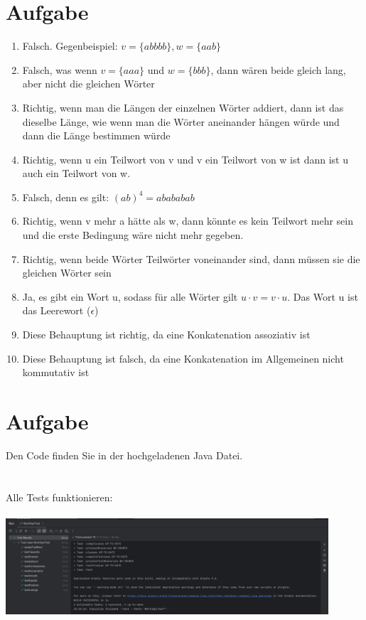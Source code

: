 \documentclass[a4paper,12pt,titlepage]{article}
\begin{document}
\section{Aufgabe}
\begin{enumerate}
\item Falsch. Gegenbeispiel: $v = \{abbbb\}, w = \{aab\}$
\item Falsch, was wenn $v = \{aaa\}$ und $w = \{bbb\}$, dann wären beide gleich lang, aber nicht die gleichen Wörter
\item Richtig, wenn man die Längen der einzelnen Wörter addiert, dann ist das dieselbe Länge, wie wenn man die Wörter aneinander hängen würde und dann die Länge bestimmen würde
\item Richtig, wenn u ein Teilwort von v und v ein Teilwort von w ist dann ist u auch ein Teilwort von w.
\item Falsch, denn es gilt: $(ab)^4 = abababab$
\item Richtig, wenn v mehr a hätte als w, dann könnte es kein Teilwort mehr sein und die erste Bedingung wäre nicht mehr gegeben.
\item Richtig, wenn beide Wörter Teilwörter voneinander sind, dann müssen sie die gleichen Wörter sein
\item Ja, es gibt ein Wort u, sodass für alle Wörter gilt $u \cdot v = v \cdot u$. Das Wort u ist das Leerewort ($\epsilon$)
\item Diese Behauptung ist richtig, da eine Konkatenation assoziativ ist
\item Diese Behauptung ist falsch, da eine Konkatenation im Allgemeinen nicht kommutativ ist
\end{enumerate}
\section{Aufgabe}
Den Code finden Sie in der hochgeladenen Java Datei.\\
\\
\\
Alle Tests funktionieren:\\
\\
\includegraphics[width=0.9\textwidth]{passedTests.png}
\end{document}
